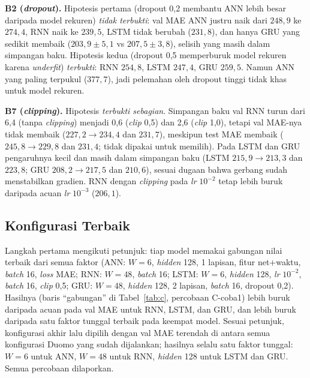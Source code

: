 \documentclass[conference,a4paper]{IEEEtran}
\begin{document}
\textbf{B2 (\textit{dropout}).} Hipotesis pertama (dropout 0,2 membantu ANN lebih besar daripada model rekuren) \emph{tidak terbukti}: val MAE ANN justru naik dari $248{,}9$ ke $274{,}4$, RNN naik ke $239{,}5$, LSTM tidak berubah ($231{,}8$), dan hanya GRU yang sedikit membaik ($203{,}9 \pm 5{,}1$ vs $207{,}5 \pm 3{,}8$), selisih yang masih dalam simpangan baku. Hipotesis kedua (dropout 0,5 memperburuk model rekuren karena \textit{underfit}) \emph{terbukti}: RNN $254{,}8$, LSTM $247{,}4$, GRU $259{,}5$. Namun ANN yang paling terpukul ($377{,}7$), jadi pelemahan oleh dropout tinggi tidak khas untuk model rekuren.

\textbf{B7 (\textit{clipping}).} Hipotesis \emph{terbukti sebagian}. Simpangan baku val RNN turun dari 6,4 (tanpa \textit{clipping}) menjadi 0,6 (\textit{clip} 0,5) dan 2,6 (\textit{clip} 1,0), tetapi val MAE-nya tidak membaik ($227{,}2 \to 234{,}4$ dan $231{,}7$), meskipun test MAE membaik ($245{,}8 \to 229{,}8$ dan $231{,}4$; tidak dipakai untuk memilih). Pada LSTM dan GRU pengaruhnya kecil dan masih dalam simpangan baku (LSTM $215{,}9 \to 213{,}3$ dan $223{,}8$; GRU $208{,}2 \to 217{,}5$ dan $210{,}6$), sesuai dugaan bahwa gerbang sudah menstabilkan gradien. RNN dengan \textit{clipping} pada \textit{lr} $10^{-2}$ tetap lebih buruk daripada acuan \textit{lr} $10^{-3}$ ($206{,}1$).

\subsection{Konfigurasi Terbaik}
Langkah pertama mengikuti petunjuk: tiap model memakai gabungan nilai terbaik dari semua faktor (ANN: $W=6$, \textit{hidden} 128, 1 lapisan, fitur net+waktu, \textit{batch} 16, \textit{loss} MAE; RNN: $W=48$, \textit{batch} 16; LSTM: $W=6$, \textit{hidden} 128, \textit{lr} $10^{-2}$, \textit{batch} 16, \textit{clip} 0,5; GRU: $W=48$, \textit{hidden} 128, 2 lapisan, \textit{batch} 16, dropout 0,2). Hasilnya (baris ``gabungan'' di Tabel~\ref{tab:c}, percobaan C-coba1) lebih buruk daripada acuan pada val MAE untuk RNN, LSTM, dan GRU, dan lebih buruk daripada satu faktor tunggal terbaik pada keempat model. Sesuai petunjuk, konfigurasi akhir lalu dipilih dengan val MAE terendah di antara semua konfigurasi Duomo yang sudah dijalankan; hasilnya selalu satu faktor tunggal: $W=6$ untuk ANN, $W=48$ untuk RNN, \textit{hidden} 128 untuk LSTM dan GRU. Semua percobaan dilaporkan.
\end{document}
